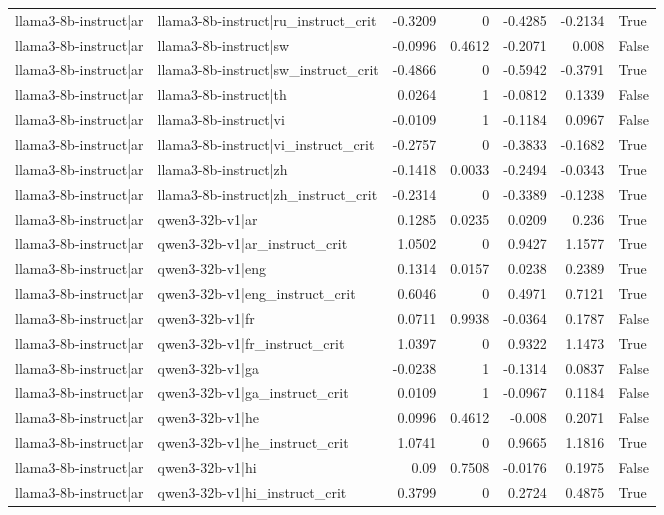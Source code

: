 \begin{table}
\begin{tabular}{l l r r r r l}
llama3-8b-instruct|ar & llama3-8b-instruct|ru_instruct_crit & -0.3209 & 0 & -0.4285 & -0.2134 & True \\
llama3-8b-instruct|ar & llama3-8b-instruct|sw & -0.0996 & 0.4612 & -0.2071 & 0.008 & False \\
llama3-8b-instruct|ar & llama3-8b-instruct|sw_instruct_crit & -0.4866 & 0 & -0.5942 & -0.3791 & True \\
llama3-8b-instruct|ar & llama3-8b-instruct|th & 0.0264 & 1 & -0.0812 & 0.1339 & False \\
llama3-8b-instruct|ar & llama3-8b-instruct|vi & -0.0109 & 1 & -0.1184 & 0.0967 & False \\
llama3-8b-instruct|ar & llama3-8b-instruct|vi_instruct_crit & -0.2757 & 0 & -0.3833 & -0.1682 & True \\
llama3-8b-instruct|ar & llama3-8b-instruct|zh & -0.1418 & 0.0033 & -0.2494 & -0.0343 & True \\
llama3-8b-instruct|ar & llama3-8b-instruct|zh_instruct_crit & -0.2314 & 0 & -0.3389 & -0.1238 & True \\
llama3-8b-instruct|ar & qwen3-32b-v1|ar & 0.1285 & 0.0235 & 0.0209 & 0.236 & True \\
llama3-8b-instruct|ar & qwen3-32b-v1|ar_instruct_crit & 1.0502 & 0 & 0.9427 & 1.1577 & True \\
llama3-8b-instruct|ar & qwen3-32b-v1|eng & 0.1314 & 0.0157 & 0.0238 & 0.2389 & True \\
llama3-8b-instruct|ar & qwen3-32b-v1|eng_instruct_crit & 0.6046 & 0 & 0.4971 & 0.7121 & True \\
llama3-8b-instruct|ar & qwen3-32b-v1|fr & 0.0711 & 0.9938 & -0.0364 & 0.1787 & False \\
llama3-8b-instruct|ar & qwen3-32b-v1|fr_instruct_crit & 1.0397 & 0 & 0.9322 & 1.1473 & True \\
llama3-8b-instruct|ar & qwen3-32b-v1|ga & -0.0238 & 1 & -0.1314 & 0.0837 & False \\
llama3-8b-instruct|ar & qwen3-32b-v1|ga_instruct_crit & 0.0109 & 1 & -0.0967 & 0.1184 & False \\
llama3-8b-instruct|ar & qwen3-32b-v1|he & 0.0996 & 0.4612 & -0.008 & 0.2071 & False \\
llama3-8b-instruct|ar & qwen3-32b-v1|he_instruct_crit & 1.0741 & 0 & 0.9665 & 1.1816 & True \\
llama3-8b-instruct|ar & qwen3-32b-v1|hi & 0.09 & 0.7508 & -0.0176 & 0.1975 & False \\
llama3-8b-instruct|ar & qwen3-32b-v1|hi_instruct_crit & 0.3799 & 0 & 0.2724 & 0.4875 & True \\

\end{tabular}
\end{table}
